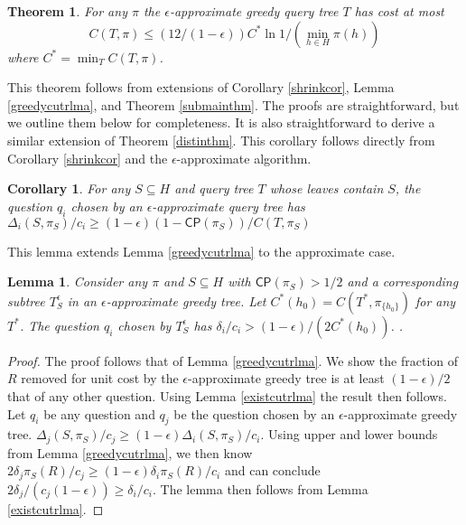 \documentclass{article}
\newtheorem{theorem}{Theorem}
\newtheorem{lemma}{Lemma}
\newtheorem{corollary}{Corollary}
\begin{document}
\begin{theorem}
For any $\pi$ the $\epsilon$-approximate 
greedy query tree $T$ has cost at most 
\[ C(T, \pi) \leq (12 / (1-\epsilon)) C^* \ln 1/(\min_{h \in H} \pi(h)) \] 
where $C^* = \min_T C(T, \pi)$. \end{theorem}

This theorem follows from extensions of Corollary \ref{shrinkcor},
Lemma \ref{greedycutrlma}, and Theorem \ref{submainthm}.  
The proofs are straightforward, but we outline them below for completeness.
It is also straightforward to derive a similar extension of
Theorem \ref{distinthm}.
This corollary follows directly from Corollary \ref{shrinkcor} and
the $\epsilon$-approximate algorithm.

\begin{corollary}For any 
$S \subseteq H$ and query tree $T$ whose leaves contain $S$, the
question $q_i$ chosen by an $\epsilon$-approximate query
tree has $\Delta_i(S, \pi_S) / c_i
\geq (1-\epsilon) (1 - \mathsf{CP}(\pi_S)) / C(T, \pi_S)$ 
\label{epshrinkcor} \end{corollary}

This lemma extends Lemma \ref{greedycutrlma} to the approximate case.

\begin{lemma} Consider any $\pi$ and $S \subseteq H$ with $\mathsf{CP}(\pi_S) >
1/2$ and a corresponding subtree $T^{\epsilon}_S$ in an $\epsilon$-approximate 
greedy tree. Let $C^*(h_0) = C(T^*, \pi_{\lbrace h_0 \rbrace})$ for any $T^*$.
The question $q_i$ chosen by $T^{\epsilon}_S$ 
has $\delta_i / c_i > (1-\epsilon)/(2C^*(h_0))$.
. \label{approxgreedycutrlma} \end{lemma}

\begin{proof}
The proof follows that of Lemma \ref{greedycutrlma}.  We show
the fraction of $R$ removed for unit cost by the $\epsilon$-approximate
greedy tree is at least $(1-\epsilon) / 2$ that of any other question.
Using Lemma \ref{existcutrlma} the result then follows. Let $q_i$ be any
question and $q_j$ be the
question chosen by an $\epsilon$-approximate greedy tree.  
$\Delta_j(S, \pi_S) / c_j \geq (1-\epsilon) \Delta_i(S, \pi_S) / c_i$.
Using upper and lower bounds from Lemma \ref{greedycutrlma}, we then know 
$2\delta_j \pi_S(R) / c_j \geq (1-\epsilon) 
\delta_i \pi_S(R) / c_i$ and can conclude
$2\delta_j / (c_j (1 - \epsilon)) \geq \delta_i/c_i$.  The lemma then
follows from Lemma \ref{existcutrlma}. 
\end{proof}
\end{document}
